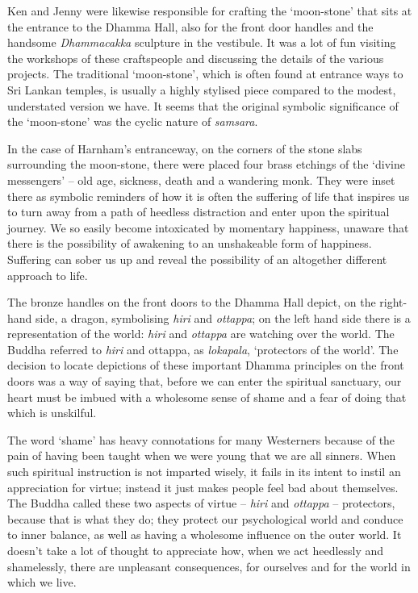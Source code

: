 Ken and Jenny were likewise responsible for crafting the `moon-stone'
that sits at the entrance to the Dhamma Hall, also for the front door
handles and the handsome \emph{Dhammacakka} sculpture in the vestibule.
It was a lot of fun visiting the workshops of these craftspeople and
discussing the details of the various projects. The traditional
`moon-stone', which is often found at entrance ways to Sri Lankan
temples, is usually a highly stylised piece compared to the modest,
understated version we have. It seems that the original symbolic
significance of the `moon-stone' was the cyclic nature of \emph{samsara}\cite{sandakada}.

In the case of Harnham's entranceway, on the corners of the stone slabs
surrounding the moon-stone, there were placed four brass etchings of the
`divine messengers\cite{divine}' -- old age, sickness, death and a wandering
monk. They were inset there as symbolic reminders of how it is often the
suffering of life that inspires us to turn away from a path of heedless
distraction and enter upon the spiritual journey. We so easily become
intoxicated by momentary happiness, unaware that there is the
possibility of awakening to an unshakeable form of happiness. Suffering
can sober us up and reveal the possibility of an altogether different
approach to life.

The bronze handles on the front doors to the Dhamma Hall depict, on the
right-hand side, a dragon, symbolising \emph{hiri} and \emph{ottappa}\cite{hiri};
on the left hand side there is a representation of the world: \emph{hiri} and
\emph{ottappa} are watching over the world. The Buddha referred to
\emph{hiri} and ottappa, as \emph{lokapala}, `protectors of the world'.
The decision to locate depictions of these important Dhamma principles
on the front doors was a way of saying that, before we can enter the
spiritual sanctuary, our heart must be imbued with a wholesome sense of
shame and a fear of doing that which is unskilful.

The word `shame' has heavy connotations for many Westerners because of
the pain of having been taught when we were young that we are all
sinners. When such spiritual instruction is not imparted wisely, it
fails in its intent to instil an appreciation for virtue; instead it
just makes people feel bad about themselves. The Buddha called these two
aspects of virtue -- \emph{hiri} and \emph{ottappa} -- protectors,
because that is what they do; they protect our psychological world and
conduce to inner balance, as well as having a wholesome influence on the
outer world. It doesn't take a lot of thought to appreciate how, when we
act heedlessly and shamelessly, there are unpleasant consequences, for
ourselves and for the world in which we live.

